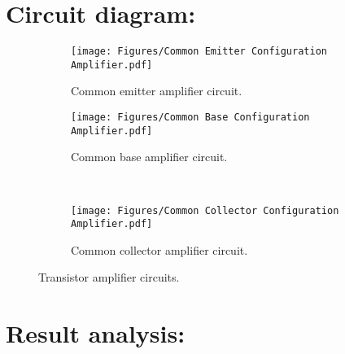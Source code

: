\documentclass[a4paper, 12pt]{extarticle}
\begin{document}
\section{Circuit diagram:}
    \begin{figure}[htbp]
    \centering
        \begin{subfigure}[h]{0.45\textwidth}
        \centering
            \texttt{[image: Figures/Common Emitter Configuration Amplifier.pdf]}
            \caption{Common emitter amplifier circuit.}
            \label{fig:Common emitter amplifier circuit}
        \end{subfigure}
        \hfill
        \begin{subfigure}[h]{0.45\textwidth}
        \centering
            \texttt{[image: Figures/Common Base Configuration Amplifier.pdf]}
            \caption{Common base amplifier circuit.}
            \label{fig:Common base amplifier circuit}
        \end{subfigure}
        \\
        \begin{subfigure}[h]{\textwidth}
        \centering
            \texttt{[image: Figures/Common Collector Configuration Amplifier.pdf]}
            \caption{Common collector amplifier circuit.}
            \label{fig:Common collector amplifier circuit}
        \end{subfigure}
        \caption{Transistor amplifier circuits.}
        \label{fig:1}
    \end{figure}

\newpage
\restoregeometry
{}
\section{Result analysis:}
\end{document}
